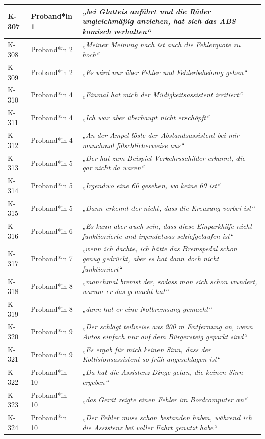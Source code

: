 {\begin{xltabular}{\textwidth}{
    |P{0.10\textwidth}
    |P{0.17\textwidth}
    |Y|
}
K-307 & Proband*in 1 & \textit{„bei Glatteis anfährt und die Räder ungleichmäßig anziehen, hat sich das ABS komisch verhalten“} \\
\hline
K-308 & Proband*in 2 & \textit{„Meiner Meinung nach ist auch die Fehlerquote zu hoch“} \\
\hline
K-309 & Proband*in 2 & \textit{„Es wird nur über Fehler und Fehlerbehebung gehen“} \\
\hline
K-310 & Proband*in 4 & \textit{„Einmal hat mich der Müdigkeitsassistent irritiert“} \\
\hline
K-311 & Proband*in 4 & \textit{„Ich war aber überhaupt nicht erschöpft“} \\
\hline
K-312 & Proband*in 4 & \textit{„An der Ampel löste der Abstandsassistent bei mir manchmal fälschlicherweise aus“} \\
\hline
K-313 & Proband*in 5 & \textit{„Der hat zum Beispiel Verkehrsschilder erkannt, die gar nicht da waren“} \\
\hline
K-314 & Proband*in 5 & \textit{„Irgendwo eine 60 gesehen, wo keine 60 ist“} \\
\hline
K-315 & Proband*in 5 & \textit{„Dann erkennt der nicht, dass die Kreuzung vorbei ist“} \\
\hline
K-316 & Proband*in 6 & \textit{„Es kann aber auch sein, dass diese Einparkhilfe nicht funktionierte und irgendetwas schiefgelaufen ist“} \\
\hline
K-317 & Proband*in 7 & \textit{„wenn ich dachte, ich hätte das Bremspedal schon genug gedrückt, aber es hat dann doch nicht funktioniert“} \\
\hline
K-318 & Proband*in 8 & \textit{„manchmal bremst der, sodass man sich schon wundert, warum er das gemacht hat“} \\
\hline
K-319 & Proband*in 8 & \textit{„dann hat er eine Notbremsung gemacht“} \\
\hline
K-320 & Proband*in 9 & \textit{„Der schlägt teilweise aus 200 m Entfernung an, wenn Autos einfach nur auf dem Bürgersteig geparkt sind“} \\
\hline
K-321 & Proband*in 9 & \textit{„Es ergab für mich keinen Sinn, dass der Kollisionsassistent so früh angeschlagen ist“} \\
\hline
K-322 & Proband*in 10 & \textit{„Da hat die Assistenz Dinge getan, die keinen Sinn ergeben“} \\
\hline
K-323 & Proband*in 10 & \textit{„das Gerät zeigte einen Fehler im Bordcomputer an“} \\
\hline
K-324 & Proband*in 10 & \textit{„Der Fehler muss schon bestanden haben, während ich die Assistenz bei voller Fahrt genutzt habe“} \\

\end{xltabular}}
